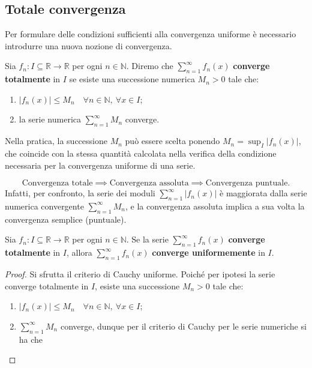 \subsection{Totale convergenza}

Per formulare delle condizioni sufficienti alla convergenza uniforme è necessario introdurre una nuova nozione di convergenza.\begin{definition}
Sia $f_n : I \subseteq \mathbb{R} \to \mathbb{R}$ per ogni $n \in \mathbb{N}$. Diremo che $\sum_{n=1}^{\infty} f_n(x)$ \textbf{converge totalmente} in $I$ se esiste una successione numerica $M_n > 0$ tale che:
\begin{enumerate}
\item $\vert{}f_n(x)\vert{} \le M_n \quad \forall n \in \mathbb{N}, \ \forall x \in I$;
\item la serie numerica $\sum_{n=1}^{\infty} M_n$ converge.
\end{enumerate}
\end{definition}Nella pratica, la successione $M_n$ può essere scelta ponendo $M_n = \sup_{I} \vert{}f_n(x)\vert{}$, che coincide con la stessa quantità calcolata nella verifica della condizione necessaria per la convergenza uniforme di una serie.\begin{oss}[Implicazioni]
$$\text{Convergenza totale} \implies \text{Convergenza assoluta} \implies \text{Convergenza puntuale}.$$
Infatti, per confronto, la serie dei moduli $\sum_{n=1}^{\infty} \vert{}f_n(x)\vert{}$ è maggiorata dalla serie numerica convergente $\sum_{n=1}^{\infty} M_n$, e la convergenza assoluta implica a sua volta la convergenza semplice (puntuale).
\end{oss}\begin{theorem}
Sia $f_n : I \subseteq \mathbb{R} \to \mathbb{R}$ per ogni $n \in \mathbb{N}$. Se la serie $\sum_{n=1}^{\infty} f_n(x)$ \textbf{converge totalmente} in $I$, allora $\sum_{n=1}^{\infty} f_n(x)$ \textbf{converge uniformemente} in $I$.
\end{theorem}\begin{proof}
Si sfrutta il criterio di Cauchy uniforme. Poiché per ipotesi la serie converge totalmente in $I$, esiste una successione $M_n > 0$ tale che:
\begin{enumerate}
\item $\vert{}f_n(x)\vert{} \le M_n \quad \forall n \in \mathbb{N}, \ \forall x \in I$;
\item $\sum_{n=1}^{\infty} M_n$ converge, dunque per il criterio di Cauchy per le serie numeriche si ha che

\end{enumerate}
\end{proof}

